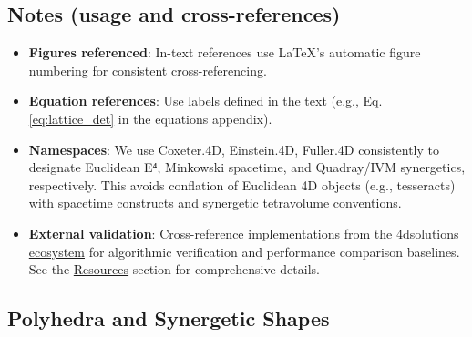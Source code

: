 \documentclass[
  10pt,
]{article}
\providecommand{\tightlist}{%
  \setlength{\itemsep}{0pt}\setlength{\parskip}{0pt}}
\begin{document}
\subsection{Notes (usage and
cross-references)}\label{notes-usage-and-cross-references}

\begin{itemize}
\tightlist
\item
  \textbf{Figures referenced}: In-text references use LaTeX's automatic
  figure numbering for consistent cross-referencing.
\item
  \textbf{Equation references}: Use labels defined in the text (e.g.,
  Eq. \eqref{eq:lattice_det} in the equations appendix).
\item
  \textbf{Namespaces}: We use Coxeter.4D, Einstein.4D, Fuller.4D
  consistently to designate Euclidean E⁴, Minkowski spacetime, and
  Quadray/IVM synergetics, respectively. This avoids conflation of
  Euclidean 4D objects (e.g., tesseracts) with spacetime constructs and
  synergetic tetravolume conventions.
\item
  \textbf{External validation}: Cross-reference implementations from the
  \href{https://github.com/4dsolutions}{4dsolutions ecosystem} for
  algorithmic verification and performance comparison baselines. See the
  \href{07_resources.md}{Resources} section for comprehensive details.
\end{itemize}

\subsection{Polyhedra and Synergetic
Shapes}\label{polyhedra-and-synergetic-shapes}
\end{document}
